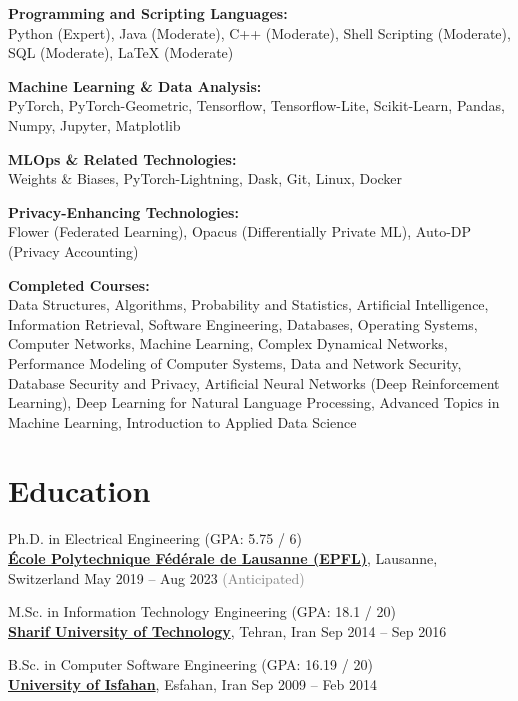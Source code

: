 \documentclass[10pt]{article}
\begin{document}
\begin{outerlist}
	\item \textbf{Programming and Scripting Languages:}\\
	{Python (Expert), Java (Moderate), C++ (Moderate), Shell Scripting (Moderate), SQL (Moderate), LaTeX (Moderate)}

	\item \textbf{Machine Learning \& Data Analysis:}\\
	{PyTorch, PyTorch-Geometric, Tensorflow, Tensorflow-Lite, Scikit-Learn, Pandas, Numpy, Jupyter, Matplotlib}

	\item \textbf{MLOps \& Related Technologies:}\\
	{Weights \& Biases, PyTorch-Lightning, Dask, Git, Linux, Docker}

	\item \textbf{Privacy-Enhancing Technologies:}\\
	{Flower (Federated Learning), Opacus (Differentially Private ML), Auto-DP (Privacy Accounting)}

  \item \textbf{Completed Courses:}\\
  Data Structures, Algorithms, Probability and Statistics, Artificial Intelligence, Information Retrieval, Software Engineering, Databases, Operating Systems, Computer Networks, Machine Learning, Complex Dynamical Networks, Performance Modeling of Computer Systems, Data and Network Security, Database Security and Privacy, Artificial Neural Networks (Deep Reinforcement Learning), Deep Learning for Natural Language Processing, Advanced Topics in Machine Learning, Introduction to Applied Data Science
\end{outerlist}


\section{Education}
\begin{outerlist}

	\item Ph.D. in Electrical Engineering (GPA: 5.75 / 6)\\
	\href{https://www.epfl.ch/en/home/}{\textbf{École Polytechnique Fédérale de Lausanne (EPFL)}}, Lausanne, Switzerland \hfill {May 2019 -- Aug 2023 \textcolor{gray}{(Anticipated)}}

	\item M.Sc. in Information Technology Engineering (GPA: 18.1 / 20)\\
	\href{http://www.en.sharif.edu/}{\textbf{Sharif University of Technology}}, Tehran, Iran \hfill {Sep 2014 -- Sep 2016}

	\item B.Sc. in Computer Software Engineering (GPA: 16.19 / 20)\\
	\href{http://ui.ac.ir/EN}{\textbf{University of Isfahan}}, Esfahan, Iran \hfill {Sep 2009 -- Feb 2014}

\end{outerlist}
\end{document}
